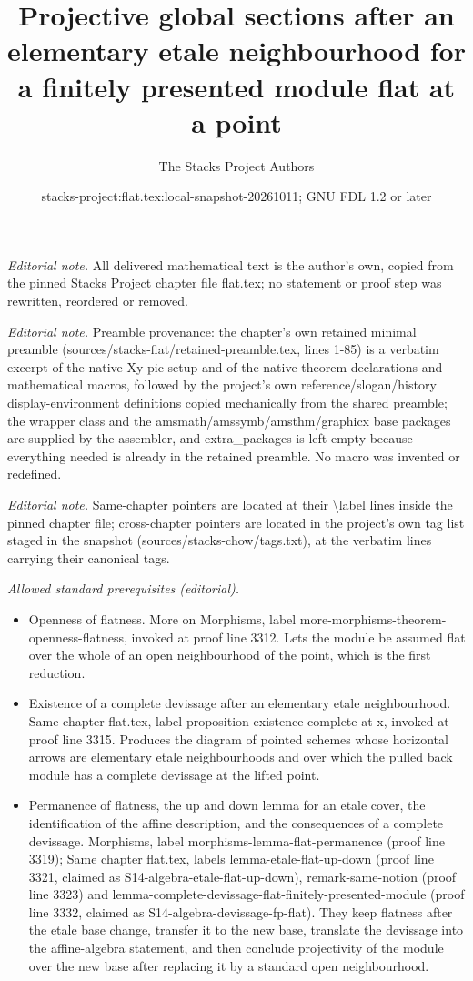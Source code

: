 \documentclass[10pt,a4paper]{amsart}
\title{Projective global sections after an elementary etale neighbourhood for a finitely presented module flat at a point}
\author{The Stacks Project Authors}
\date{stacks-project:flat.tex:local-snapshot-20261011; GNU FDL 1.2 or later}
\theoremstyle{plain}
\theoremstyle{definition}
\theoremstyle{remark}
\numberwithin{equation}{subsection}
\begin{document}
\maketitle
\noindent\textit{Editorial note.} All delivered mathematical text is the author's own, copied from the pinned Stacks Project chapter file flat.tex; no statement or proof step was rewritten, reordered or removed.\par\medskip
\noindent\textit{Editorial note.} Preamble provenance: the chapter's own retained minimal preamble (sources/stacks-flat/retained-preamble.tex, lines 1-85) is a verbatim excerpt of the native Xy-pic setup and of the native theorem declarations and mathematical macros, followed by the project's own reference/slogan/history display-environment definitions copied mechanically from the shared preamble; the wrapper class and the amsmath/amssymb/amsthm/graphicx base packages are supplied by the assembler, and extra\_packages is left empty because everything needed is already in the retained preamble. No macro was invented or redefined.\par\medskip
\noindent\textit{Editorial note.} Same-chapter pointers are located at their \textbackslash{}label lines inside the pinned chapter file; cross-chapter pointers are located in the project's own tag list staged in the snapshot (sources/stacks-chow/tags.txt), at the verbatim lines carrying their canonical tags.\par\medskip
\noindent\textit{Allowed standard prerequisites (editorial).}\begin{itemize}
\item Openness of flatness. More on Morphisms, label more-morphisms-theorem-openness-flatness, invoked at proof line 3312. Lets the module be assumed flat over the whole of an open neighbourhood of the point, which is the first reduction.
\item Existence of a complete devissage after an elementary etale neighbourhood. Same chapter flat.tex, label proposition-existence-complete-at-x, invoked at proof line 3315. Produces the diagram of pointed schemes whose horizontal arrows are elementary etale neighbourhoods and over which the pulled back module has a complete devissage at the lifted point.
\item Permanence of flatness, the up and down lemma for an etale cover, the identification of the affine description, and the consequences of a complete devissage. Morphisms, label morphisms-lemma-flat-permanence (proof line 3319); Same chapter flat.tex, labels lemma-etale-flat-up-down (proof line 3321, claimed as S14-algebra-etale-flat-up-down), remark-same-notion (proof line 3323) and lemma-complete-devissage-flat-finitely-presented-module (proof line 3332, claimed as S14-algebra-devissage-fp-flat). They keep flatness after the etale base change, transfer it to the new base, translate the devissage into the affine-algebra statement, and then conclude projectivity of the module over the new base after replacing it by a standard open neighbourhood.
\end{itemize}\medskip
\end{document}
